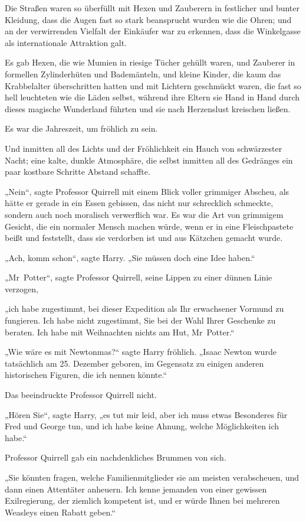 {Die Straßen waren so überfüllt mit Hexen und Zauberern in festlicher und bunter Kleidung, dass die Augen fast so stark beansprucht wurden wie die Ohren; und an der verwirrenden Vielfalt der Einkäufer war zu erkennen, dass die Winkelgasse als internationale Attraktion galt.

Es gab Hexen, die wie Mumien in riesige Tücher gehüllt waren, und Zauberer in formellen Zylinderhüten und Bademänteln, und kleine Kinder, die kaum das Krabbelalter überschritten hatten und mit Lichtern geschmückt waren, die fast so hell leuchteten wie die Läden selbst, während ihre Eltern sie Hand in Hand durch dieses magische Wunderland führten und sie nach Herzenslust kreischen ließen.

Es war die Jahreszeit, um fröhlich zu sein.

Und inmitten all des Lichts und der Fröhlichkeit ein Hauch von schwärzester Nacht; eine kalte, dunkle Atmosphäre, die selbst inmitten all des Gedränges ein paar kostbare Schritte Abstand schaffte.

„Nein“, sagte Professor Quirrell mit einem Blick voller grimmiger Abscheu, als hätte er gerade in ein Essen gebissen, das nicht nur schrecklich schmeckte, sondern auch noch moralisch verwerflich war. Es war die Art von grimmigem Gesicht, die ein normaler Mensch machen würde, wenn er in eine Fleischpastete beißt und feststellt, dass sie verdorben ist und aus Kätzchen gemacht wurde.

„Ach, komm schon“, sagte Harry. „Sie müssen doch eine Idee haben.“

„Mr~Potter“, sagte Professor Quirrell, seine Lippen zu einer dünnen Linie verzogen,

„ich habe zugestimmt, bei dieser Expedition als Ihr erwachsener Vormund zu fungieren. Ich habe nicht zugestimmt, Sie bei der Wahl Ihrer Geschenke zu beraten. Ich habe mit Weihnachten nichts am Hut, Mr~Potter.“

„Wie wäre es mit Newtonmas?“ sagte Harry fröhlich. „Isaac Newton wurde tatsächlich am 25. Dezember geboren, im Gegensatz zu einigen anderen historischen Figuren, die ich nennen könnte.“

Das beeindruckte Professor Quirrell nicht.

„Hören Sie“, sagte Harry, „es tut mir leid, aber ich muss etwas Besonderes für Fred und George tun, und ich habe keine Ahnung, welche Möglichkeiten ich habe.“

Professor Quirrell gab ein nachdenkliches Brummen von sich.

„Sie könnten fragen, welche Familienmitglieder sie am meisten verabscheuen, und dann einen Attentäter anheuern. Ich kenne jemanden von einer gewissen Exilregierung, der ziemlich kompetent ist, und er würde Ihnen bei mehreren Weasleys einen Rabatt geben.“

}
